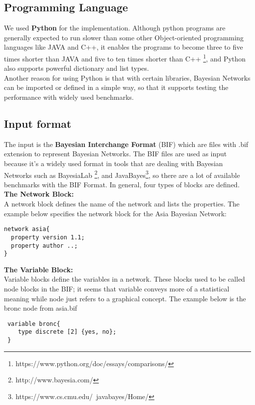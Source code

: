 \subsection{Programming Language}
We used \textbf{Python} for the implementation. Although python programs are generally expected to run slower than some other Object-oriented programming languages like JAVA and C++, it enables the programs to become three to five times shorter than JAVA and five to ten times shorter than C++ \footnote{https://www.python.org/doc/essays/comparisons/}, 
and Python also supports powerful dictionary and list types. \\

\noindent Another reason for using Python is that with certain libraries, Bayesian Networks can be imported or defined in a simple way, so that it supports testing the performance with widely used benchmarks.

\subsection{Input format}
The input is the \textbf{Bayesian Interchange Format} (BIF) which are files with .bif extension to represent Bayesian Networks. The BIF files are used as input because it's a widely used format in tools that are dealing with Bayesian Networks such as BayesiaLab \footnote{http://www.bayesia.com/}, and  JavaBayes\footnote{https://www.cs.cmu.edu/~javabayes/Home/}, so there are a lot of available benchmarks with the BIF Format. In general, four types of blocks are defined.\\

\noindent \textbf{The Network Block:}\\
\noindent A network block defines the name of the network and lists the properties. The example below specifies the network block for the Asia Bayesian Network:
\begin{lstlisting}
network asia{
  property version 1.1;
  property author ..;
}
\end{lstlisting}

\noindent \textbf{The Variable Block:}\\
Variable blocks define the variables in a network. These blocks used
to be called node blocks in the BIF; it seems that variable conveys
more of a statistical meaning while node just refers to a graphical
concept. The example below is the bronc node from asia.bif
\begin{lstlisting}
 variable bronc{
    type discrete [2] {yes, no};
 }
\end{lstlisting}

